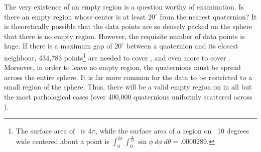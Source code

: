 \documentclass[11pt]{article}
\begin{document}
The very existence of an empty region is a question worthy of examination.
Is there an empty region whose center is at least $20^{\circ}$ from the
nearest quaternion?
It is theoretically possible that the data points are so densely packed
on the sphere that there is no empty region.
However, the requisite number of data points is huge.
If there is a maximum gap of $20^{\circ}$ between a quaternion and its
closest neighbour, 434,783 points\footnote{The surface area 
	of \ is $4\pi$, while the surface area
	of a region on \ 10 degrees wide centered about a point is 
	$\int_{0}^{2\pi} \int_0^{\frac{\pi}{18}}  \sin \phi \ d\phi \ d\theta
	= .0000289$.} %
are needed to cover , and even more to cover .
Moreover, in order to leave no empty region, the quaternions
must be spread across the entire sphere.
It is far more common for the data to be restricted to a small region
of the sphere.
Thus, there will be a valid empty region on  in all but the most
pathological cases (over 400,000 quaternions uniformly scattered across ).

\end{document}
